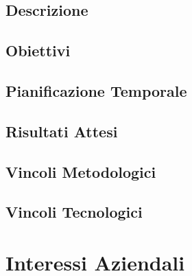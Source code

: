 \subsection{Descrizione}
\subsection{Obiettivi}
\subsection{Pianificazione Temporale}
\subsection{Risultati Attesi}
\subsection{Vincoli Metodologici}
\subsection{Vincoli Tecnologici}
\section{Interessi Aziendali}